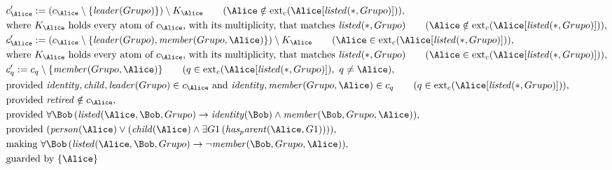 \begin{align*}
&
c'_
{
\Alice
}
 := 
(c_
{
\Alice
}
 \setminus 
\{
\mathit{
leader
}
(
Grupo
)
\}
) \setminus K_
{
\Alice
}
 \qquad (
\Alice
 \notin 
\mathrm{ext}_c(
\Alice
[
\mathit{
listed
}
(
\ast
,
Grupo
)
]
)
)
,\\
&
\text{where } K_
{
\Alice
}
 \text{ holds every atom of } c_
{
\Alice
}
 \text{, with its multiplicity, that matches } 
\mathit{
listed
}
(
\ast
,
Grupo
)
 \qquad (
\Alice
 \notin 
\mathrm{ext}_c(
\Alice
[
\mathit{
listed
}
(
\ast
,
Grupo
)
]
)
)
,\\
&
c'_
{
\Alice
}
 := 
(c_
{
\Alice
}
 \setminus 
\{
\mathit{
leader
}
(
Grupo
)
,
\mathit{
member
}
(
Grupo
,
\Alice
)
\}
) \setminus K_
{
\Alice
}
 \qquad (
\Alice
 \in 
\mathrm{ext}_c(
\Alice
[
\mathit{
listed
}
(
\ast
,
Grupo
)
]
)
)
,\\
&
\text{where } K_
{
\Alice
}
 \text{ holds every atom of } c_
{
\Alice
}
 \text{, with its multiplicity, that matches } 
\mathit{
listed
}
(
\ast
,
Grupo
)
 \qquad (
\Alice
 \in 
\mathrm{ext}_c(
\Alice
[
\mathit{
listed
}
(
\ast
,
Grupo
)
]
)
)
,\\
&
c'_
q
 := 
c_
q
 \setminus 
\{
\mathit{
member
}
(
Grupo
,
\Alice
)
\}
 \qquad (
q
 \in 
\mathrm{ext}_c(
\Alice
[
\mathit{
listed
}
(
\ast
,
Grupo
)
]
)
,\ 
q \neq 
\Alice
)
,\\
&
\text{provided } 
\mathit{
identity
}
,
\mathit{
child
}
,
\mathit{
leader
}
(
Grupo
)
 \in c_
{
\Alice
}
 \text{ and } 
\mathit{
identity
}
,
\mathit{
member
}
(
Grupo
,
\Alice
)
 \in c_
q
 \qquad (
q \in 
\mathrm{ext}_c(
\Alice
[
\mathit{
listed
}
(
\ast
,
Grupo
)
]
)
)
,\\
&
\text{provided } 
\mathit{
retired
}
 \notin c_
{
\Alice
}
,\\
&
\text{provided } 
\forall 
\Bob
\,(
\mathit{
listed
}
(
\Alice
,
\Bob
,
Grupo
)
\rightarrow
\mathit{
identity
}
(
\Bob
)
\land
\mathit{
member
}
(
\Bob
,
Grupo
,
\Alice
)
)
,\\
&
\text{provided } 
(
\mathit{
person
}
(
\Alice
)
\lor
(
\mathit{
child
}
(
\Alice
)
\land
\exists 
G1
\,(
\mathit{
has_parent
}
(
\Alice
,
G1
)
)
)
)
,\\
&
\text{making } 
\forall 
\Bob
\,(
\mathit{
listed
}
(
\Alice
,
\Bob
,
Grupo
)
\rightarrow
\neg 
\mathit{
member
}
(
\Bob
,
Grupo
,
\Alice
)
)
,\\
&
\text{guarded by } \{
\Alice
\}
\end{align*}

